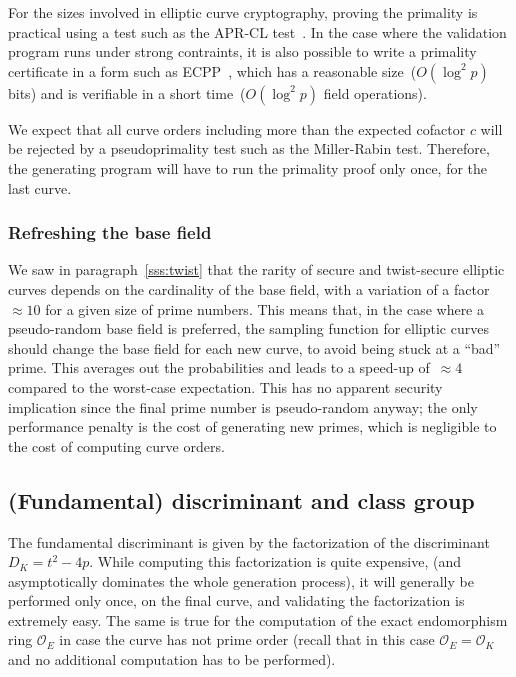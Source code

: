 \documentclass[twocolumn,letterpaper,10pt]{article}
\let\ro\mathcal
\begin{document}
For the sizes involved in elliptic curve cryptography,
proving the primality is practical using a test such as
the APR-CL test~\cite{fcs1980adleman,mathcomp1984cl}.
In the case where the validation program runs under strong contraints,
it is also possible to write a primality certificate
in a form such as ECPP~\cite{mathcomp1993am},
which has a reasonable size~($O(\log^2 p)$ bits)
and is verifiable in a short time~($O(\log^2 p)$ field operations).

We expect that all curve orders including more than the expected cofactor $c$
will be rejected by a pseudoprimality test such as the Miller-Rabin test.
Therefore, the generating program will have to run the primality proof
only once, for the last curve.

\subsubsection{Refreshing the base field}

We saw in paragraph~\ref{sss:twist} that the rarity of
secure and twist-secure elliptic curves depends on the
cardinality of the base field,
with a variation of a factor~$≈ 10$ for a given size of prime numbers.
This means that,
in the case where a pseudo-random base field is preferred,
the sampling function for elliptic curves should change the base field
for each new curve, to avoid being stuck at a ``bad'' prime.
This averages out the probabilities
and leads to a speed-up of~$≈ 4$ compared to the worst-case expectation.
This has no apparent security implication
since the final prime number is pseudo-random anyway;
the only performance penalty is the cost of generating new primes,
which is negligible to the cost of computing curve orders.


\subsection{(Fundamental) discriminant and class group}

The fundamental discriminant is given by
the factorization of the discriminant~$D_K = t^2 - 4 p$.
While computing this factorization is quite expensive,
(and asymptotically dominates the whole generation process),
it will generally be performed only once, on the final curve,
and validating the factorization is extremely easy.
The same is true for the computation of the exact endomorphism
ring $\ro O_E$ in case the curve has not prime order (recall that
in this case $\ro O_E = \ro O_K$ and no additional computation has
to be performed).
\end{document}
